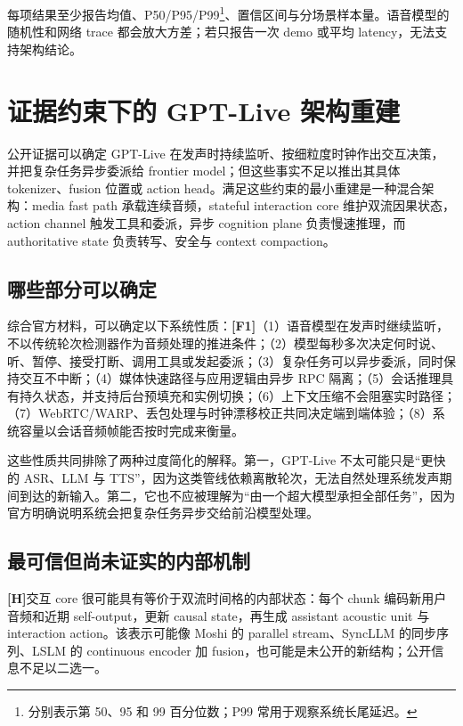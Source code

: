 \documentclass[UTF8,fontset=none,a4paper,10pt]{ctexart}
\newcommand{\FOne}{\textcolor{official}{\textbf{[F1]}}}
\newcommand{\Hyp}{\textcolor{hypothesis}{\textbf{[H]}}}
\begin{document}
每项结果至少报告均值、P50/P95/P99\footnote{分别表示第 50、95 和 99 百分位数；P99 常用于观察系统长尾延迟。}、置信区间与分场景样本量。语音模型的随机性和网络 trace 都会放大方差；若只报告一次 demo 或平均 latency，无法支持架构结论。

\section{证据约束下的 GPT-Live 架构重建}

公开证据可以确定 GPT-Live 在发声时持续监听、按细粒度时钟作出交互决策，并把复杂任务异步委派给 frontier model；但这些事实不足以推出其具体 tokenizer、fusion 位置或 action head。满足这些约束的最小重建是一种混合架构：media fast path 承载连续音频，stateful interaction core 维护双流因果状态，action channel 触发工具和委派，异步 cognition plane 负责慢速推理，而 authoritative state 负责转写、安全与 context compaction。

\subsection{哪些部分可以确定}

综合官方材料，可以确定以下系统性质：\FOne（1）语音模型在发声时继续监听，不以传统轮次检测器作为音频处理的推进条件；（2）模型每秒多次决定何时说、听、暂停、接受打断、调用工具或发起委派；（3）复杂任务可以异步委派，同时保持交互不中断；（4）媒体快速路径与应用逻辑由异步 RPC 隔离；（5）会话推理具有持久状态，并支持后台预填充和实例切换；（6）上下文压缩不会阻塞实时路径；（7）WebRTC/WARP、丢包处理与时钟漂移校正共同决定端到端体验；（8）系统容量以会话音频帧能否按时完成来衡量\cite{openai2026gptlive,openai2026continuous}。

这些性质共同排除了两种过度简化的解释。第一，GPT-Live 不太可能只是“更快的 ASR、LLM 与 TTS”，因为这类管线依赖离散轮次，无法自然处理系统发声期间到达的新输入。第二，它也不应被理解为“由一个超大模型承担全部任务”，因为官方明确说明系统会把复杂任务异步交给前沿模型处理。

\subsection{最可信但尚未证实的内部机制}

\Hyp 交互 core 很可能具有等价于双流时间格的内部状态：每个 chunk 编码新用户音频和近期 self-output，更新 causal state，再生成 assistant acoustic unit 与 interaction action。该表示可能像 Moshi 的 parallel stream、SyncLLM 的同步序列、LSLM 的 continuous encoder 加 fusion，也可能是未公开的新结构；公开信息不足以二选一。
\end{document}
